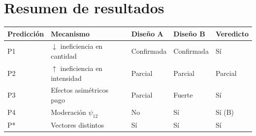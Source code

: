 \documentclass[12pt]{article}
\begin{document}
\section{Resumen de resultados}

\begin{center}
\begin{tabular}{lllll}
\toprule
Predicción & Mecanismo & Diseño A & Diseño B & Veredicto \\
\midrule
P1 & $\downarrow$ ineficiencia en cantidad & Confirmada & Confirmada & Sí \\
P2 & $\uparrow$ ineficiencia en intensidad & Parcial & Parcial & Parcial \\
P3 & Efectos asimétricos pago & Parcial & Fuerte & Sí \\
P4 & Moderación $\psi_{12}$ & No & Sí & Sí (B) \\
P* & Vectores distintos & Sí & Sí & Sí \\
\bottomrule
\end{tabular}
\end{center}
\end{document}
